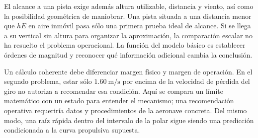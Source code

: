 El alcance a una pista exige además altura utilizable, distancia y viento, así como la posibilidad geométrica de maniobrar. Una pista situada a una distancia menor que $hE$ en aire inmóvil pasa sólo una primera prueba ideal de alcance. Si se llega a su vertical sin altura para organizar la aproximación, la comparación escalar no ha resuelto el problema operacional. La función del modelo básico es establecer órdenes de magnitud y reconocer qué información adicional cambia la conclusión.

Un cálculo coherente debe diferenciar margen físico y margen de operación. En el segundo problema, estar sólo $1.60\ \mathrm{m/s}$ por encima de la velocidad de pérdida del giro no autoriza a recomendar esa condición. Aquí se compara un límite matemático con un estado para entender el mecanismo; una recomendación operativa requeriría datos y procedimientos de la aeronave concreta. Del mismo modo, una raíz rápida dentro del intervalo de la polar sigue siendo una predicción condicionada a la curva propulsiva supuesta.

